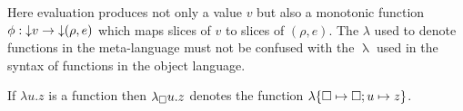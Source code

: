 

Here evaluation produces not only a value $v$ but also a monotonic function $\phi: {\downarrow}{v} \to {\downarrow}{(\rho,e)}$ which maps slices of $v$ to slices of $(\rho,e)$. The $\lambda$ used to denote functions in the meta-language must not be confused with the $\uplambda$ used in the syntax of functions in the object language.

If $\lambda u.z$ is a function then $\lambda_{\square} u.z$ denotes the function $\lambda\{\square \mapsto \square; u \mapsto z\}$.


